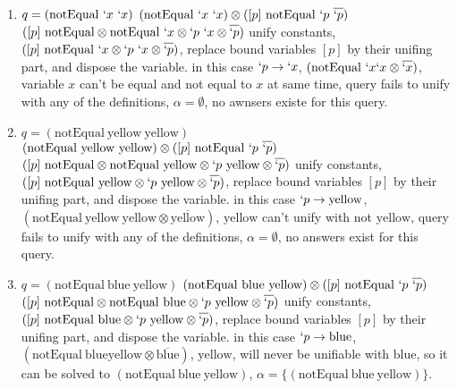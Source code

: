 \documentclass[11pt,a4paper]{report}
\newcommand{\var}[1]{`#1}
\newcommand{\unify}{\otimes}
\begin{document}
\begin{enumerate}
\item $q = (\text{notEqual}\ \var{x}\ \var{x})$
\subitem $(\text{notEqual}\ \var{x}\ \var{x}) \unify ([p]\ \text{notEqual}\ \var{p}\ \overline{\var{p}})$
\subitem $([p]\ \text{notEqual} \unify \text{notEqual}\ \var{x} \unify \var{p}\ \var{x} \unify \overline{\var{p}})$
\subitem unify constants, $([p]\ \text{notEqual}\ \var{x} \unify \var{p}\ \var{x} \unify \overline{\var{p}})$,
\subitem replace bound variables $[p]$ by their unifing part, and dispose the variable.
\subitem in this case $\var{p} \rightarrow \var{x}$, $(\text{notEqual}\ \var{x} \var{x} \unify \overline{\var{x}})$,
\subitem variable $x$ can't be equal and not equal to $x$ at same time,
\subitem query fails to unify with any of the definitions,
\subitem $\alpha=\emptyset$, no awnsers existe for this query.

\item $q = (\text{notEqual}\  \text{yellow}\ \text{yellow})$
\subitem $(\text{notEqual}\ \text{yellow}\ \text{yellow}) \unify ([p]\ \text{notEqual}\ \var{p}\ \overline{\var{p}})$
\subitem $([p]\ \text{notEqual} \unify \text{notEqual}\ \text{yellow} \unify \var{p}\ \text{yellow} \unify \overline{\var{p}})$
\subitem unify constants, $([p]\ \text{notEqual}\ \text{yellow} \unify \var{p}\ \text{yellow} \unify \overline{\var{p}})$,
\subitem replace bound variables $[p]$ by their unifing part, and dispose the variable.
\subitem in this case $\var{p} \rightarrow \text{yellow}$, $(\text{notEqual}\ \text{yellow}\ \text{yellow} \unify \overline{\text{yellow}})$,
\subitem $\text{yellow}$ can't unify with not $\text{yellow}$,
\subitem query fails to unify with any of the definitions,
\subitem $\alpha=\emptyset$, no answers exist for this query.

\item $q = (\text{notEqual}\  \text{blue}\ \text{yellow})$
\subitem $(\text{notEqual}\ \text{blue}\ \text{yellow}) \unify ([p]\ \text{notEqual}\ \var{p}\ \overline{\var{p}})$
\subitem $([p]\ \text{notEqual} \unify \text{notEqual}\ \text{blue} \unify \var{p}\ \text{yellow} \unify \overline{\var{p}})$
\subitem unify constants, $([p]\ \text{notEqual}\ \text{blue} \unify \var{p}\ \text{yellow} \unify \overline{\var{p}})$,
\subitem replace bound variables $[p]$ by their unifing part, and dispose the variable.
\subitem in this case $\var{p} \rightarrow \text{blue}$, $(\text{notEqual}\ \text{blue} \text{yellow} \unify \overline{\text{blue}})$,
\subitem $\text{yellow}$, will never be unifiable with $\text{blue}$, so it can be solved to $(\text{notEqual}\ \text{blue}\ \text{yellow})$,
\subitem $\alpha=\{(\text{notEqual}\ \text{blue}\ \text{yellow})\}$.


\end{enumerate}
\end{document}
